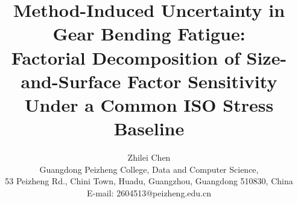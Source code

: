 \documentclass[12pt,a4paper]{article}
\begin{document}
\title{\textbf{Method-Induced Uncertainty in Gear Bending Fatigue:\\
Factorial Decomposition of Size-and-Surface Factor Sensitivity\\
Under a Common ISO Stress Baseline}}

\author{Zhilei Chen\\
Guangdong Peizheng College, Data and Computer Science,\\
53 Peizheng Rd., Chini Town, Huadu, Guangzhou, Guangdong 510830, China\\
E-mail: 2604513@peizheng.edu.cn}

\maketitle

\end{document}
